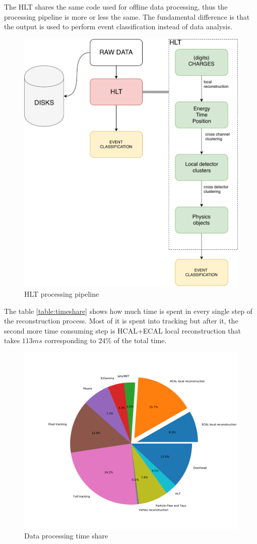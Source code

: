 The HLT shares the same code used for offline data processing, thus the processing pipeline is more or less the same. The fundamental difference is that the output is used to perform event classification instead of data analysis. 
\begin{figure}[ht]
  \centering
  \caption{HLT processing pipeline}
  \label{img:hlt}
  \includegraphics[width=.70\textwidth]{img/hlt}
\end{figure}
The table \ref{table:timeshare} shows how much time is spent in every single step of the reconstruction process. Most of it is spent into tracking but after it, the second more time consuming step is HCAL+ECAL local reconstruction that takes $113 ms$ corresponding to $24\%$ of the total time.
\begin{figure}[ht]
  \caption{Data processing time share}
  \label{img:hlt}
  \includegraphics[width=\textwidth]{img/timeshare}
\end{figure}
